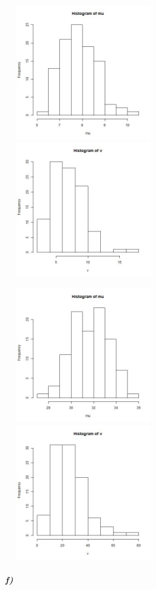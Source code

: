 \documentclass{article}
\begin{document}
\includegraphics[height=6cm,width=7cm]{2emean40.jpg}
\includegraphics[height=6cm,width=7cm]{2evar40.jpg}

\includegraphics[height=6cm,width=7cm]{2emean160.jpg}
\includegraphics[height=6cm,width=7cm]{2evar160.jpg}
\subparagraph{f)}~{}
\end{document}
